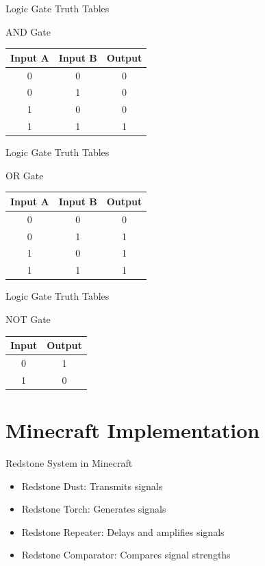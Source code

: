 \documentclass{beamer}
\begin{document}
\begin{frame}{Logic Gate Truth Tables}
    \begin{block}{AND Gate}
        \begin{tabular}{|c|c|c|}
            \hline
            Input A & Input B & Output \\
            \hline
            0 & 0 & 0 \\
            0 & 1 & 0 \\
            1 & 0 & 0 \\
            1 & 1 & 1 \\
            \hline
        \end{tabular}
    \end{block}
\end{frame}

\begin{frame}{Logic Gate Truth Tables}
    \begin{block}{OR Gate}
        \begin{tabular}{|c|c|c|}
            \hline
            Input A & Input B & Output \\
            \hline
            0 & 0 & 0 \\
            0 & 1 & 1 \\
            1 & 0 & 1 \\
            1 & 1 & 1 \\
            \hline
        \end{tabular}
    \end{block}
\end{frame}

\begin{frame}{Logic Gate Truth Tables}
    \begin{block}{NOT Gate}
        \begin{tabular}{|c|c|}
            \hline
            Input & Output \\
            \hline
            0 & 1 \\
            1 & 0 \\
            \hline
        \end{tabular}
    \end{block}
\end{frame}

\section{Minecraft Implementation}
\begin{frame}{Redstone System in Minecraft}
    \begin{itemize}
        \item Redstone Dust: Transmits signals
        \item Redstone Torch: Generates signals
        \item Redstone Repeater: Delays and amplifies signals
        \item Redstone Comparator: Compares signal strengths
    \end{itemize}
\end{frame}
\end{document}
